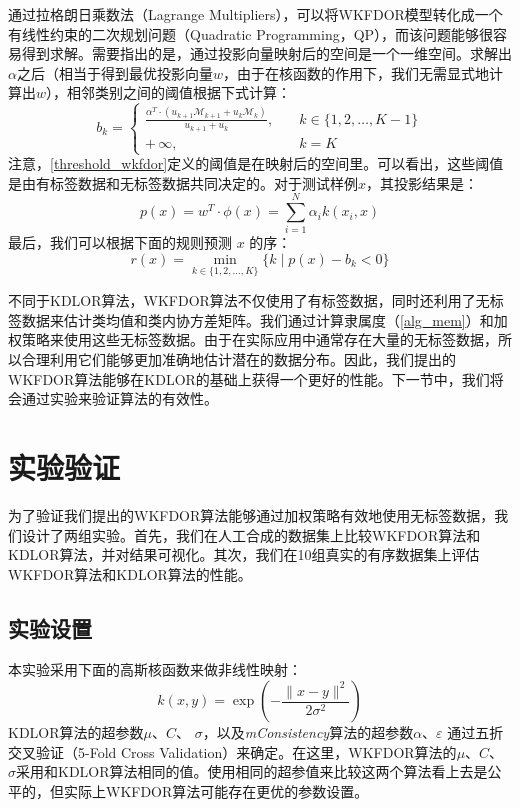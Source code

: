 通过拉格朗日乘数法（Lagrange Multipliers），可以将WKFDOR模型转化成一个有线性约束的二次规划问题（Quadratic Programming，QP），而该问题能够很容易得到求解。需要指出的是，通过投影向量映射后的空间是一个一维空间。求解出\(\alpha\)之后（相当于得到最优投影向量\(w\)，由于在核函数的作用下，我们无需显式地计算出\(w\)），相邻类别之间的阈值根据下式计算：
\begin{equation}
\label{threshold_wkfdor}
b_{k}=\begin{cases}
\frac{\alpha^{T} \cdot (u_{k+1} \mathcal{M}_{k+1} + u_{k} \mathcal{M}_{k})}{u_{k+1}+u_{k}},\quad &k \in \{1,2,\dots,K-1\} \\
+\,\infty,\quad &k=K
\end{cases}
\end{equation}
注意，\autoref{threshold_wkfdor}定义的阈值是在映射后的空间里。可以看出，这些阈值是由有标签数据和无标签数据共同决定的。对于测试样例\(x\)，其投影结果是：
\begin{equation}
\label{projResult_wkfdor}
p(x)=w^{T} \cdot \phi(x)=\sum_{i=1}^{N} \alpha_{i} k(x_{i},x)
\end{equation}
最后，我们可以根据下面的规则预测 \(x\) 的序：
\begin{equation}
\label{rank_rule_wkfdor}
r(x)=\min \limits_{k \in \{1,2,\dots,K\}} \{k\mid p(x)-b_{k}<0\}
\end{equation}

不同于KDLOR算法，WKFDOR算法不仅使用了有标签数据，同时还利用了无标签数据来估计类均值和类内协方差矩阵。我们通过计算隶属度（\autoref{alg_mem}）和加权策略来使用这些无标签数据。由于在实际应用中通常存在大量的无标签数据，所以合理利用它们能够更加准确地估计潜在的数据分布。因此，我们提出的WKFDOR算法能够在KDLOR的基础上获得一个更好的性能。下一节中，我们将会通过实验来验证算法的有效性。

\section{实验验证}
为了验证我们提出的WKFDOR算法能够通过加权策略有效地使用无标签数据，我们设计了两组实验。首先，我们在人工合成的数据集上比较WKFDOR算法和KDLOR算法，并对结果可视化。其次，我们在10组真实的有序数据集上评估WKFDOR算法和KDLOR算法的性能。

\subsection{实验设置}
\label{wkfdor_expSet}
本实验采用下面的高斯核函数来做非线性映射：
\begin{equation}
\label{Gaussian_kernel}
k(x,y)=\exp(-\frac{\parallel x-y \parallel^{2}}{2\sigma^{2}})
\end{equation}
KDLOR算法的超参数\(\mu\)、\(C\)、 \(\sigma\)，以及\textit{mConsistency}算法的超参数\(\alpha\)、\(\varepsilon\) 通过五折交叉验证（5-Fold Cross Validation）来确定。在这里，WKFDOR算法的\(\mu\)、\(C\)、 \(\sigma\)采用和KDLOR算法相同的值。使用相同的超参值来比较这两个算法看上去是公平的，但实际上WKFDOR算法可能存在更优的参数设置。

